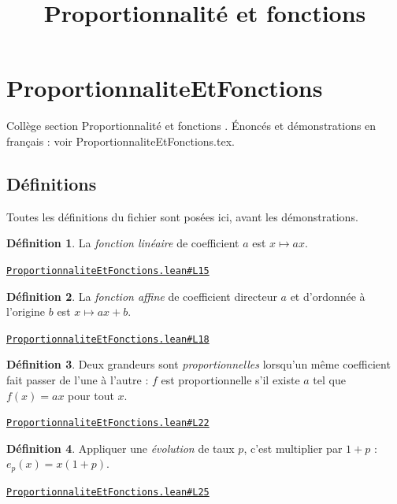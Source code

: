 \documentclass[11pt,a4paper]{article}
\title{Proportionnalité et fonctions}
\date{}
\theoremstyle{definition}
\newtheorem{definition}{Définition}
\theoremstyle{plain}
\newcommand{\source}[2]{\par\smallskip\noindent\hfill{\footnotesize\href{#1}{\texttt{#2}}}\par\smallskip}
\begin{document}
\maketitle
\sloppy

\section{ProportionnaliteEtFonctions}

\noindent
Collège \textemdash{} section \og{} Proportionnalité et fonctions \fg{}.
Énoncés et démonstrations en français : voir ProportionnaliteEtFonctions.tex.

\subsection{Définitions}

\noindent
Toutes les définitions du fichier sont posées ici, avant les démonstrations.

\begin{definition}
La \emph{fonction linéaire} de coefficient $a$ est $x \mapsto ax$.
\end{definition}
\source{https://github.com/Commutator-IO/learn-lean/blob/main/courses/01-college/05-proportionnalite-et-fonctions/ProportionnaliteEtFonctions.lean\#L15}{ProportionnaliteEtFonctions.lean\#L15}

\begin{definition}
La \emph{fonction affine} de coefficient directeur $a$ et d'ordonnée à l'origine $b$
est $x \mapsto ax + b$.
\end{definition}
\source{https://github.com/Commutator-IO/learn-lean/blob/main/courses/01-college/05-proportionnalite-et-fonctions/ProportionnaliteEtFonctions.lean\#L18}{ProportionnaliteEtFonctions.lean\#L18}

\begin{definition}
Deux grandeurs sont \emph{proportionnelles} lorsqu'un même coefficient fait passer de
l'une à l'autre : $f$ est proportionnelle s'il existe $a$ tel que $f(x) = ax$ pour tout
$x$.
\end{definition}
\source{https://github.com/Commutator-IO/learn-lean/blob/main/courses/01-college/05-proportionnalite-et-fonctions/ProportionnaliteEtFonctions.lean\#L22}{ProportionnaliteEtFonctions.lean\#L22}

\begin{definition}
Appliquer une \emph{évolution} de taux $p$, c'est multiplier par $1 + p$ :
$e_p(x) = x(1 + p)$.
\end{definition}
\source{https://github.com/Commutator-IO/learn-lean/blob/main/courses/01-college/05-proportionnalite-et-fonctions/ProportionnaliteEtFonctions.lean\#L25}{ProportionnaliteEtFonctions.lean\#L25}
\end{document}
